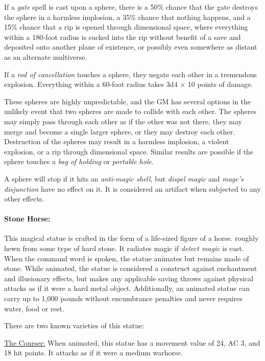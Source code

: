 \begin{multicols}{2}
If a \textit{gate} spell is cast upon a sphere, there is a 50\% chance that the gate destroys the sphere in a harmless implosion, a 35\% chance that nothing happens, and a 15\% chance that a rip is opened through dimensional space, where everything within a 180-foot radius is sucked into the rip without benefit of a save and deposited onto another plane of existence, or possibly even somewhere as distant as an alternate multiverse.  

If a \textit{rod of cancellation} touches a sphere, they negate each other in a tremendous explosion.  Everything within a 60-foot radius takes 3d4 × 10 points of damage.  

These spheres are highly unpredictable, and the GM has several options in the unlikely event that two spheres are made to collide with each other.  The spheres may simply pass through each other as if the other was not there, they may merge and become a single larger sphere, or they may destroy each other.  Destruction of the spheres may result in a harmless implosion, a violent explosion, or a rip through dimensional space.  Similar results are possible if the sphere touches a \textit{bag of holding} or \textit{portable hole}.

A sphere will stop if it hits an \textit{anti-magic shell}, but \textit{dispel magic} and \textit{mage's disjunction} have no effect on it.  It is considered an artifact when subjected to any other effects.

\paragraph{Stone Horse:} This magical statue is crafted in the form of a life-sized figure of a horse. roughly hewn from some type of hard stone.  It radiates magic if \textit{detect magic} is cast.  When the command word is spoken, the statue animates but remains made of stone.   While animated, the statue is considered a construct against enchantment and illusionary effects, but makes any applicable saving throws against physical attacks as if it were a hard metal object.  Additionally, an animated statue can carry up to 1,000 pounds without encumbrance penalties and never requires water, food or rest.  

There are two known varieties of this statue:

\underline{The Courser:} When animated, this statue has a movement value of 24, AC 3, and 18 hit points.  It attacks as if it were a medium warhorse.


\end{multicols}

